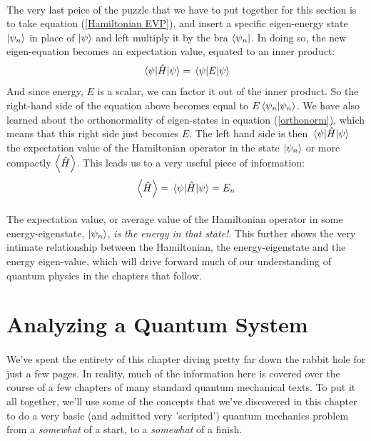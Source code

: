 \documentclass[12pt,letterpaper]{book}
\begin{document}
\paragraph*{}The very last peice of the puzzle that we have to put together for this section is to take equation (\ref{Hamiltonian EVP}), and insert a specific eigen-energy state $\ket{\psi_n}$ in place of $\ket{\psi}$ and left multiply it by the bra 
$\bra{\psi_n}$. In doing so, the new eigen-equation becomes an expectation value, equated to an inner product:
\begin{equation}
\expval{\hat{H}}{\psi} = \expval{E}{\psi}
\end{equation}
And since energy, $E$ is a scalar, we can factor it out of the inner product. So the right-hand side of the equation above becomes equal to $E\braket{\psi_n}{\psi_n}$. We have also learned about the orthonormality of eigen-states in equation (\ref{orthonorm}), which means that this right side just becomes $E$. The left hand side is then $\expval{\hat{H}}{\psi}$ the expectation value of the Hamiltonian operator in the state $\ket{\psi_n}$ or more compactly $\expval{\hat{H}}$. This leads us to a very useful piece of information:
\begin{equation} 
\expval{\hat{H}} = \expval{\hat{H}}{\psi} = E_n
\end{equation}
\paragraph*{}The expectation value, or average value of the Hamiltonian operator in some energy-eigenstate, $\ket{\psi_n}$, \textit{is the energy in that state!}. This further shows the very intimate relationship between the Hamiltonian, the energy-eigenstate and the energy eigen-value, which will drive forward much of our understanding of quantum physics in the chapters that follow.


\section{Analyzing a Quantum System}
\paragraph*{}We've spent the entirety of this chapter diving pretty far down the rabbit hole for just a few pages. In reality, much of the information here is covered over the course of a few chapters of many standard quantum mechanical texts. To put it all together, we'll use some of the concepts that we've discovered in this chapter to do a very basic (and admitted very 'scripted') quantum mechanics problem from a \textit{somewhat} of a start, to a \textit{somewhat} of a finish. 
\end{document}
